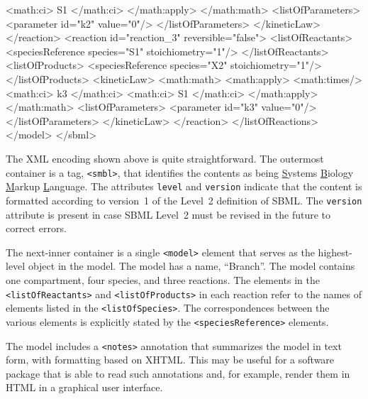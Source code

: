 \documentclass[10pt]{cekarticle}
\begin{document}
\begin{example}
                            <math:ci> S1 </math:ci>
                        </math:apply>
                    </math:math>
                    <listOfParameters>
                        <parameter id="k2" value="0"/>
                    </listOfParameters>
                </kineticLaw>
            </reaction>
            <reaction id="reaction_3" reversible="false">
                <listOfReactants>
                    <speciesReference species="S1" stoichiometry="1"/>
                </listOfReactants>
                <listOfProducts>
                    <speciesReference species="X2" stoichiometry="1"/>
                </listOfProducts>
                <kineticLaw>
                    <math:math>
                        <math:apply>
                            <math:times/>
                            <math:ci> k3 </math:ci>
                            <math:ci> S1 </math:ci>
                        </math:apply>
                    </math:math>
                    <listOfParameters>
                        <parameter id="k3" value="0"/>
                    </listOfParameters>
                </kineticLaw>
            </reaction>
        </listOfReactions>
    </model>
</sbml>
\end{example}

The XML encoding shown above is quite straightforward. The
outermost container is a tag, \texttt{<smbl>}, that identifies the
contents as being \underline{S}ystems \underline{B}iology
\underline{M}arkup \underline{L}anguage.  The attributes
\texttt{level} and \texttt{version} indicate that the content is
formatted according to version~1 of the Level~2 definition of
SBML. The \texttt{version} attribute is present in case SBML
Level~2 must be revised in the future to correct errors.

The next-inner container is a single \texttt{<model>} element that
serves as the highest-level object in the model.  The model has a
name, ``Branch''. The model contains one compartment, four
species, and three reactions.  The elements in the
\texttt{<listOfReactants>} and \texttt{<listOfProducts>} in each
reaction refer to the names of elements listed in the
\texttt{<listOfSpecies>}.  The correspondences between the various
elements is explicitly stated by the \texttt{<speciesReference>}
elements.

The model includes a \texttt{<notes>} annotation that summarizes the model
in text form, with formatting based on XHTML.  This may be useful for a
software package that is able to read such annotations and, for example,
render them in HTML in a graphical user interface.
\end{document}

